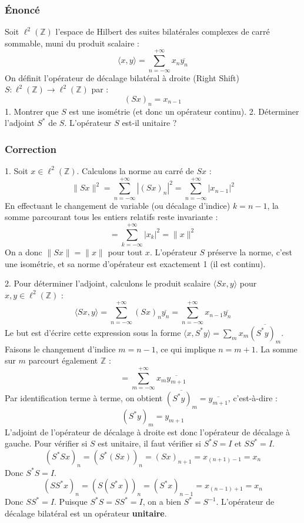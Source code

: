 \documentclass[11pt,a4paper]{article}
\begin{document}
\subsubsection*{Énoncé}
Soit $\ell^2(\mathbb{Z})$ l'espace de Hilbert des suites bilatérales complexes de carré sommable, muni du produit scalaire :
$$ \langle x, y \rangle = \sum_{n=-\infty}^{+\infty} x_n \overline{y_n} $$
On définit l'opérateur de décalage bilatéral à droite (Right Shift) $S : \ell^2(\mathbb{Z}) \to \ell^2(\mathbb{Z})$ par :
$$ (Sx)_n = x_{n-1} $$
1. Montrer que $S$ est une isométrie (et donc un opérateur continu).
2. Déterminer l'adjoint $S^*$ de $S$. L'opérateur $S$ est-il unitaire ?

\subsubsection*{Correction}
1. Soit $x \in \ell^2(\mathbb{Z})$. Calculons la norme au carré de $Sx$ :
$$ \|Sx\|^2 = \sum_{n=-\infty}^{+\infty} |(Sx)_n|^2 = \sum_{n=-\infty}^{+\infty} |x_{n-1}|^2 $$
En effectuant le changement de variable (ou décalage d'indice) $k = n - 1$, la somme parcourant tous les entiers relatifs reste invariante :
$$ = \sum_{k=-\infty}^{+\infty} |x_k|^2 = \|x\|^2 $$
On a donc $\|Sx\| = \|x\|$ pour tout $x$. L'opérateur $S$ préserve la norme, c'est une isométrie, et sa norme d'opérateur est exactement 1 (il est continu).

2. Pour déterminer l'adjoint, calculons le produit scalaire $\langle Sx, y \rangle$ pour $x, y \in \ell^2(\mathbb{Z})$ :
$$ \langle Sx, y \rangle = \sum_{n=-\infty}^{+\infty} (Sx)_n \overline{y_n} = \sum_{n=-\infty}^{+\infty} x_{n-1} \overline{y_n} $$
Le but est d'écrire cette expression sous la forme $\langle x, S^*y \rangle = \sum_m x_m \overline{(S^*y)_m}$.
Faisons le changement d'indice $m = n - 1$, ce qui implique $n = m + 1$. La somme sur $m$ parcourt également $\mathbb{Z}$ :
$$ = \sum_{m=-\infty}^{+\infty} x_m \overline{y_{m+1}} $$
Par identification terme à terme, on obtient $\overline{(S^*y)_m} = \overline{y_{m+1}}$, c'est-à-dire :
$$ (S^*y)_m = y_{m+1} $$
L'adjoint de l'opérateur de décalage à droite est donc l'opérateur de décalage à gauche.
Pour vérifier si $S$ est unitaire, il faut vérifier si $S^* S = I$ et $S S^* = I$.
$$ (S^* Sx)_n = (S^*(Sx))_n = (Sx)_{n+1} = x_{(n+1)-1} = x_n $$
Donc $S^*S = I$.
$$ (SS^*x)_n = (S(S^*x))_n = (S^*x)_{n-1} = x_{(n-1)+1} = x_n $$
Donc $SS^* = I$.
Puisque $S^* S = SS^* = I$, on a bien $S^* = S^{-1}$. L'opérateur de décalage bilatéral est un opérateur \textbf{unitaire}.
\end{document}
